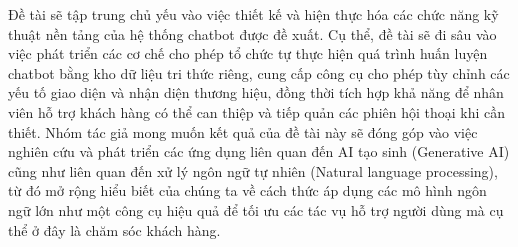 Đề tài sẽ tập trung chủ yếu vào việc thiết kế và hiện thực hóa các chức năng kỹ thuật nền tảng của hệ thống chatbot được đề xuất. Cụ thể, đề tài sẽ đi sâu vào việc phát triển các cơ chế cho phép tổ chức tự thực hiện quá trình huấn luyện chatbot bằng kho dữ liệu tri thức riêng, cung cấp công cụ cho phép tùy chỉnh các yếu tố giao diện và nhận diện thương hiệu, đồng thời tích hợp khả năng để nhân viên hỗ trợ khách hàng có thể can thiệp và tiếp quản các phiên hội thoại khi cần thiết. Nhóm tác giả mong muốn kết quả của đề tài này sẽ đóng góp vào việc nghiên cứu và phát triển các ứng dụng liên quan đến AI tạo sinh (Generative AI) cũng như liên quan đến xử lý ngôn ngữ tự nhiên (Natural language processing), từ đó mở rộng hiểu biết của chúng ta về cách thức áp dụng các mô hình ngôn ngữ lớn như một công cụ hiệu quả để tối ưu các tác vụ hỗ trợ người dùng mà cụ thể ở đây là chăm sóc khách hàng.
